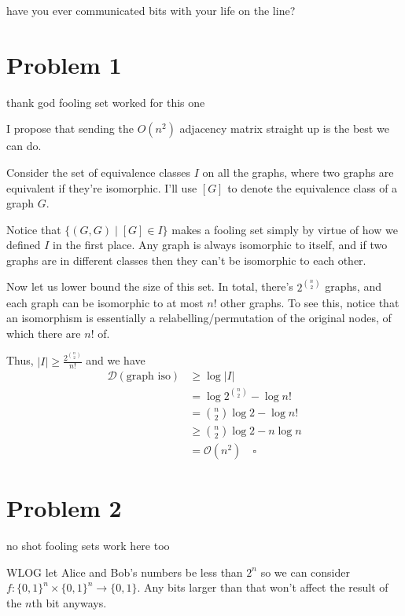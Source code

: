 \documentclass[12pt]{article}
\begin{document}

have you ever communicated bits with your life on the line?

\section*{Problem 1}

thank god fooling set worked for this one

I propose that sending the $O(n^2)$ adjacency matrix straight up is the best we can do.

Consider the set of equivalence classes $I$ on all the graphs,
where two graphs are equivalent if they're isomorphic.
I'll use $[G]$ to denote the equivalence class of a graph $G$.

Notice that $\{(G, G) \mid [G] \in I\}$ makes a fooling set
simply by virtue of how we defined $I$ in the first place.
Any graph is always isomorphic to itself, and if two graphs are in
different classes then they can't be isomorphic to each other.

Now let us lower bound the size of this set.
In total, there's $2^{\binom{n}{2}}$ graphs, and each graph
can be isomorphic to at most $n!$ other graphs.
To see this, notice that an isomorphism is essentially a relabelling/permutation
of the original nodes, of which there are $n!$ of.

Thus, $|I| \ge \frac{2^{\binom{n}{2}}}{n!}$ and we have
\begin{align*}
    \mathcal{D}(\text{graph iso})
     & \ge \log |I|                       \\
     & = \log 2^{\binom{n}{2}} - \log n!  \\
     & = \binom{n}{2} \log 2 - \log n!    \\
     & \ge \binom{n}{2} \log 2 - n \log n \\
     & = \mathcal{O}(n^2)\quad\square
\end{align*}

\newpage

\section*{Problem 2}

no shot fooling sets work here too

WLOG let Alice and Bob's numbers be less than $2^n$ so we can
consider $f: \{0, 1\}^n \times \{0, 1\}^n \to \{0, 1\}$.
Any bits larger than that won't affect the result of the $n$th bit anyways.
\end{document}

